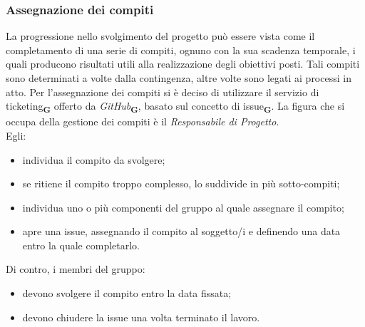 \subsubsection{Assegnazione dei compiti}
La progressione nello svolgimento del progetto può essere vista come il completamento di una serie di compiti, ognuno con la sua scadenza temporale, i quali producono risultati utili alla realizzazione degli obiettivi posti. Tali compiti sono determinati a volte dalla contingenza, altre volte sono legati ai processi in atto. Per l’assegnazione dei compiti si è deciso di utilizzare il servizio di ticketing\textsubscript{\textbf{G}} offerto da \textit{GitHub}\textsubscript{\textbf{G}}, basato sul concetto di issue\textsubscript{\textbf{G}}. La figura che si occupa della gestione dei compiti è il \textit{Responsabile di Progetto}.\\
Egli:
\begin {itemize}
\item individua il compito da svolgere;
\item se ritiene il compito troppo complesso, lo suddivide in più sotto-compiti;
\item individua uno o più componenti del gruppo al quale assegnare il compito;
\item apre una issue, assegnando il compito al soggetto/i e definendo una data entro la quale completarlo.
\end {itemize}
Di contro, i membri del gruppo:
\begin {itemize}
\item devono svolgere il compito entro la data fissata;
\item devono chiudere la issue una volta terminato il lavoro.
\end {itemize}

